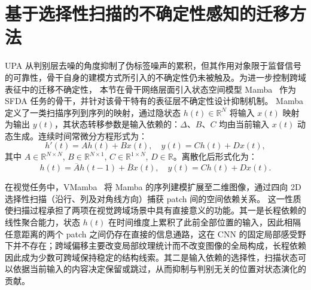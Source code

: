 

\FloatBarrier

\section{基于选择性扫描的不确定性感知的迁移方法}

\label{sec:chap2_sfmamba}

UPA 从判别层去噪的角度抑制了伪标签噪声的累积，但其作用对象限于监督信号的可靠性，骨干自身的建模方式所引入的不确定性仍未被触及。为进一步控制跨域表征中的迁移不确定性，
本节在骨干网络层面引入状态空间模型 Mamba~\cite{gu2023mamba} 作为 SFDA 任务的骨干，并针对该骨干特有的表征层不确定性设计抑制机制。
Mamba定义了一类扫描序列到序列的映射，通过隐状态 $h(t) \in \mathbb{R}^N$ 将输入 $x(t)$ 映射为输出 $y(t)$，其状态转移参数是输入依赖的：$\Delta$、$B$、$C$ 均由当前输入 $x(t)$ 动态生成。连续时间常微分方程形式为：
\begin{equation}
h'(t) = A h(t) + B x(t), \quad y(t) = C h(t) + D x(t),
\label{eq:ssm_cont}
\end{equation}
其中 $A \in \mathbb{R}^{N \times N}$, $B \in \mathbb{R}^{N \times 1}$, $C \in \mathbb{R}^{1 \times N}$, $D \in \mathbb{R}$。离散化后形式化为：
\begin{equation}
h(t) = \overline{A} h(t-1) + \overline{B} x(t), \quad y(t) = C h(t) + D x(t).
\label{eq:ssm_disc}
\end{equation}

在视觉任务中，VMamba~\cite{liu2024vmamba} 将 Mamba 的序列建模扩展至二维图像，通过四向 2D 选择性扫描（沿行、列及对角线方向）捕获 patch 间的空间依赖关系。
这一性质使扫描过程承担了两项在视觉跨域场景中具有直接意义的功能。其一是长程依赖的线性聚合能力，状态 $h(t)$ 在时间维度上累积了此前全部位置的输入，因此相隔任意距离的两个 patch 之间仍存在直接的信息通路，这在 CNN 的固定局部感受野下并不存在；跨域偏移主要改变局部纹理统计而不改变图像的全局构成，长程依赖因此成为少数可跨域保持稳定的结构线索。其二是输入依赖的选择性，扫描状态可以依据当前输入的内容决定保留或跳过，从而抑制与判别无关的位置对状态演化的贡献。


